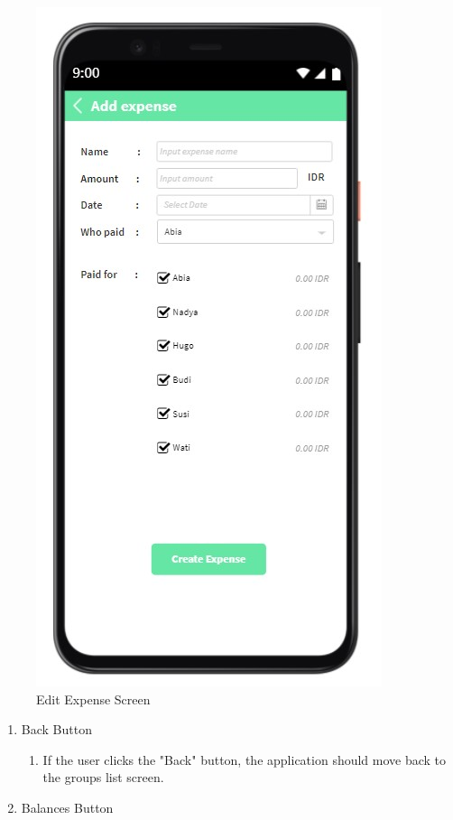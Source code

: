 \documentclass[conference]{IEEEtran}
\begin{document}
\begin{enumerate}
\begin{figure}[H]
                \centerline{\includegraphics[scale=0.5]{img/ui/expenses-create.jpg}}
                \caption{Edit Expense Screen}
                \label{fig:edit-expense-screen}
            \end{figure}
            \begin{enumerate}
                \item Back Button
                    \begin{enumerate}
                        \item If the user clicks the "Back" button, the application should move back to the groups list screen.
                    \end{enumerate}
                \item Balances Button
                    \begin{enumerate}

\end{enumerate}
\end{enumerate}
\end{enumerate}
\end{document}
